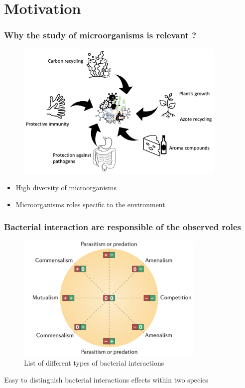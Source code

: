 \documentclass[8pt]{beamer}
\begin{document}
\section{Motivation}

\begin{frame}
\frametitle{Why the study of microorganisms is relevant ?}
\begin{figure}[t]
\centering   
\includegraphics[width=0.9\textwidth]{figures/bacterial-env.pdf}
\end{figure}
\begin{block}{}
\begin{itemize}
\item High diversity of microorganisms
\item Microorganisms roles specific to the environment \tiny\citep{10.1093/chemse/bjh067,BELKAID2014121,Zhang2015,Hoorman2011,McSweeney2000}
\end{itemize}
\end{block}
\end{frame}

\begin{frame}
\frametitle{Bacterial interaction are responsible of the observed roles}

\begin{figure}
	\centering
	\includegraphics[width=0.8\textwidth]{figures/interaction.png}
    \caption{List of different types of bacterial interactions \tiny \citep{Faust2012} }
\end{figure}
\begin{block}{}
Easy to distinguish bacterial interactions effects within two species
\end{block}

\end{frame}
\end{document}

